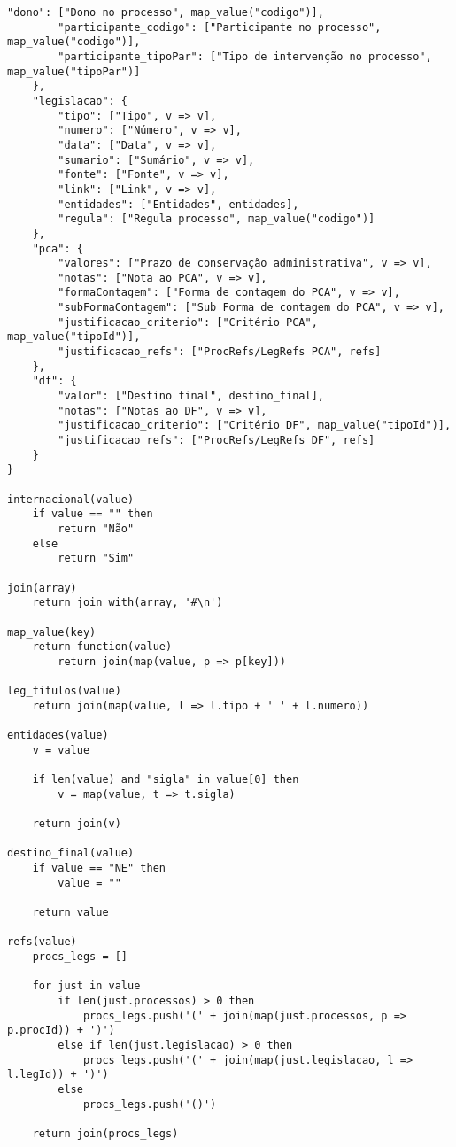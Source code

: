 \begin{lstlisting}[language=pseudocode, caption=Algorítmo de conversão de \acrshort{json} para \acrshort{csv}]
        "dono": ["Dono no processo", map_value("codigo")],
        "participante_codigo": ["Participante no processo", map_value("codigo")],
        "participante_tipoPar": ["Tipo de intervenção no processo", map_value("tipoPar")]
    },
    "legislacao": {
        "tipo": ["Tipo", v => v],
        "numero": ["Número", v => v],
        "data": ["Data", v => v],
        "sumario": ["Sumário", v => v],
        "fonte": ["Fonte", v => v],
        "link": ["Link", v => v],
        "entidades": ["Entidades", entidades],
        "regula": ["Regula processo", map_value("codigo")]
    },
    "pca": {
        "valores": ["Prazo de conservação administrativa", v => v],
        "notas": ["Nota ao PCA", v => v],
        "formaContagem": ["Forma de contagem do PCA", v => v],
        "subFormaContagem": ["Sub Forma de contagem do PCA", v => v],
        "justificacao_criterio": ["Critério PCA", map_value("tipoId")],
        "justificacao_refs": ["ProcRefs/LegRefs PCA", refs]
    },
    "df": {
        "valor": ["Destino final", destino_final],
        "notas": ["Notas ao DF", v => v],
        "justificacao_criterio": ["Critério DF", map_value("tipoId")],
        "justificacao_refs": ["ProcRefs/LegRefs DF", refs]
    }
}

internacional(value)
    if value == "" then
        return "Não"
    else
        return "Sim"

join(array)
    return join_with(array, '#\n')

map_value(key)
    return function(value)
        return join(map(value, p => p[key]))

leg_titulos(value)
    return join(map(value, l => l.tipo + ' ' + l.numero))

entidades(value)
    v = value

    if len(value) and "sigla" in value[0] then
        v = map(value, t => t.sigla)

    return join(v)

destino_final(value)
    if value == "NE" then
        value = ""

    return value

refs(value)
    procs_legs = []

    for just in value
        if len(just.processos) > 0 then
            procs_legs.push('(' + join(map(just.processos, p => p.procId)) + ')')
        else if len(just.legislacao) > 0 then
            procs_legs.push('(' + join(map(just.legislacao, l => l.legId)) + ')')
        else
            procs_legs.push('()')

    return join(procs_legs)


\end{lstlisting}
